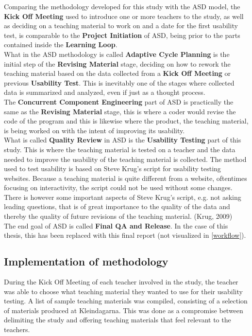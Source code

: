 Comparing the methodology developed for this study with the ASD model, the \textbf{Kick Off Meeting} used to introduce one or more teachers to the study, as well as deciding on a teaching material to work on and a date for the first usability test, is comparable to the \textbf{Project Initiation} of ASD, being prior to the parts contained inside the \textbf{Learning Loop}.\\

What in the ASD methodology is called \textbf{Adaptive Cycle Planning} is the initial step of the \textbf{Revising Material} stage, deciding on how to rework the teaching material based on the data collected from a \textbf{Kick Off Meeting} or previous \textbf{Usability Test}. This is inevitably one of the stages where collected data is summarized and analyzed, even if just as a thought process.\\

The \textbf{Concurrent Component Engineering} part of ASD is practically the same as the \textbf{Revising Material} stage, this is where a coder would revise the code of the program and this is likewise where the product, the teaching material, is being worked on with the intent of improving its
usability.\\

What is called \textbf{Quality Review} in ASD is the \textbf{Usability Testing} part of this study. This is where the teaching material is tested on a teacher and the data needed to improve the usability of the teaching material is collected. The method used to test usability is based on Steve Krug’s script for usability testing websites. Because a teaching material is quite different from a website, oftentimes focusing on interactivity, the script could not be used without some changes. There is however some important aspects of Steve Krug’s script, e.g. not asking leading questions, that is of great importance to the quality of the data and thereby the quality of future revisions of the teaching material. (Krug, 2009)\\

The end goal of ASD is called \textbf{Final QA and Release}. In the case of this thesis, this has been replaced with this final report (not visualized in \ref{workflow}).\\

\subsection{Implementation of methodology}
During the Kick Off Meeting of each teacher involved in the study, the teacher was able to choose what teaching material they wanted to use for their usability testing. A list of sample teaching materials was compiled, consisting of a selection of materials produced at  Kleindagarna. This was done as a compromise between delimiting the study and offering teaching materials that feel relevant to the teachers.\\

